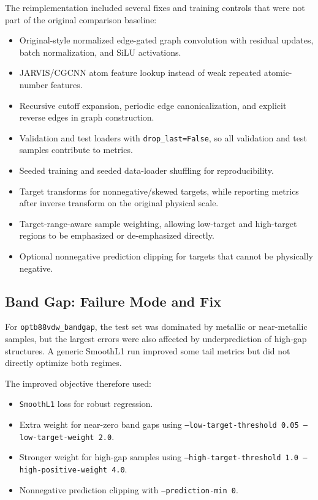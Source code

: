 \documentclass[11pt]{article}
\begin{document}
The reimplementation included several fixes and training controls that were not part of the original comparison baseline:
\begin{itemize}
  \item Original-style normalized edge-gated graph convolution with residual updates, batch normalization, and SiLU activations.
  \item JARVIS/CGCNN atom feature lookup instead of weak repeated atomic-number features.
  \item Recursive cutoff expansion, periodic edge canonicalization, and explicit reverse edges in graph construction.
  \item Validation and test loaders with \texttt{drop\_last=False}, so all validation and test samples contribute to metrics.
  \item Seeded training and seeded data-loader shuffling for reproducibility.
  \item Target transforms for nonnegative/skewed targets, while reporting metrics after inverse transform on the original physical scale.
  \item Target-range-aware sample weighting, allowing low-target and high-target regions to be emphasized or de-emphasized directly.
  \item Optional nonnegative prediction clipping for targets that cannot be physically negative.
\end{itemize}

\subsection{Band Gap: Failure Mode and Fix}

For \texttt{optb88vdw\_bandgap}, the test set was dominated by metallic or near-metallic samples, but the largest errors were also affected by underprediction of high-gap structures.  A generic SmoothL1 run improved some tail metrics but did not directly optimize both regimes.

The improved objective therefore used:
\begin{itemize}
  \item \texttt{SmoothL1} loss for robust regression.
  \item Extra weight for near-zero band gaps using \texttt{--low-target-threshold 0.05 --low-target-weight 2.0}.
  \item Stronger weight for high-gap samples using \texttt{--high-target-threshold 1.0 --high-positive-weight 4.0}.
  \item Nonnegative prediction clipping with \texttt{--prediction-min 0}.
\end{itemize}
\end{document}
